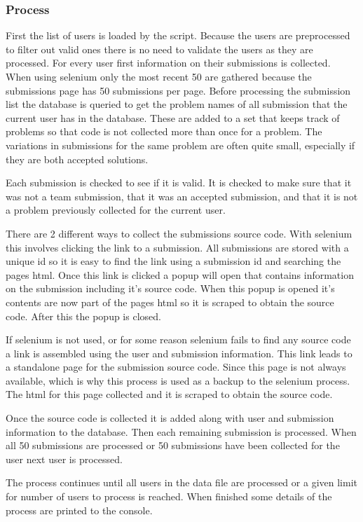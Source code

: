 \documentclass{article}
\begin{document}
\subsubsection*{Process}
First the list of users is loaded by the script. Because the users are preprocessed to filter out valid ones there is no need to validate the users as they are processed. For every user first information on their submissions is collected. When using selenium only the most recent 50 are gathered because the submissions page has 50 submissions per page. Before processing the submission list the database is queried to get the problem names of all submission that the current user has in the database. These are added to a set that keeps track of problems so that code is not collected more than once for a problem. The variations in submissions for the same problem are often quite small, especially if they are both accepted solutions.

Each submission is checked to see if it is valid. It is checked to make sure that it was not a team submission, that it was an accepted submission, and that it is not a problem previously collected for the current user.

There are 2 different ways to collect the submissions source code. With selenium this involves clicking the link to a submission. All submissions are stored with a unique id so it is easy to find the link using a submission id and searching the pages html. Once this link is clicked a popup will open that contains information on the submission including it's source code. When this popup is opened it's contents are now part of the pages html so it is scraped to obtain the source code. After this the popup is closed.

If selenium is not used, or for some reason selenium fails to find any source code a link is assembled using the user and submission information. This link leads to a standalone page for the submission source code. Since this page is not always available, which is why this process is used as a backup to the selenium process. The html for this page collected and it is scraped to obtain the source code.

Once the source code is collected it is added along with user and submission information to the database. Then each remaining submission is processed. When all 50 submissions are processed or 50 submissions have been collected for the user next user is processed.

The process continues until all users in the data file are processed or a given limit for number of users to process is reached. When finished some details of the process are printed to the console.
\end{document}
